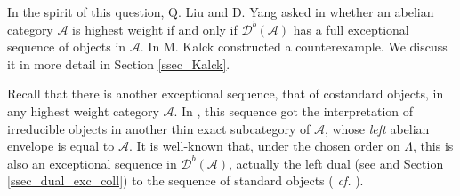 \documentclass[12pt,a4paper]{amsart}
\newcommand{\aA}{{\mathcal{A}}}
\newcommand{\dD}{{\mathcal{D}}}
\newcommand{\la}{\lambda}
\newcommand{\modu}{\mathop{\textrm{mod--}}}
\theoremstyle{definition}
\begin{document}
	
	
	
	
	
	In the spirit of this question, Q. Liu and D. Yang asked in \cite{LiuYang}  whether an abelian category $\aA$ is highest weight if and only if $\dD^b(\aA)$ has a full exceptional sequence of objects in $\aA$. In \cite[Proposition 5.6]{Kalck} M. Kalck constructed a counterexample. We discuss it in more detail in Section \ref{ssec_Kalck}. 
	
	Recall that there is another exceptional sequence, that of costandard objects, in any highest weight category $\aA$. In \cite{BodBon4}, this sequence got the interpretation of irreducible objects in another thin exact subcategory of $\aA$, whose {\it left} abelian envelope is equal to $\aA$. It is well-known that, under the chosen order on $\Lambda$, this is also an exceptional sequence in $\dD^b(\aA)$, actually the left dual (see \cite{B} and Section \ref{ssec_dual_exc_coll}) to the sequence of standard objects ( {\it cf.} \cite[Proposition 4.19]{Rou4}).
	
\end{document}
